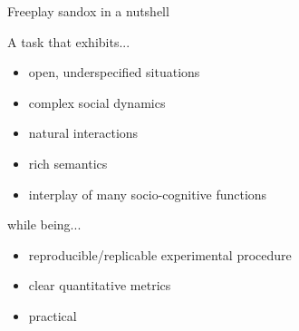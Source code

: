 \documentclass[compress]{beamer}
\begin{document}
\begin{frame}{Freeplay sandox in a nutshell}

    A task that exhibits...

    \begin{itemize}
        \item open, underspecified situations
            \item complex social dynamics
            \item natural interactions
            \item rich semantics
            \item interplay of many socio-cognitive functions
    \end{itemize}

    \pause

    while being...
    \begin{itemize}
        \item reproducible/replicable experimental procedure
        \item clear quantitative metrics
        \item practical
    \end{itemize}
\end{frame}

%
%
%
\end{document}
